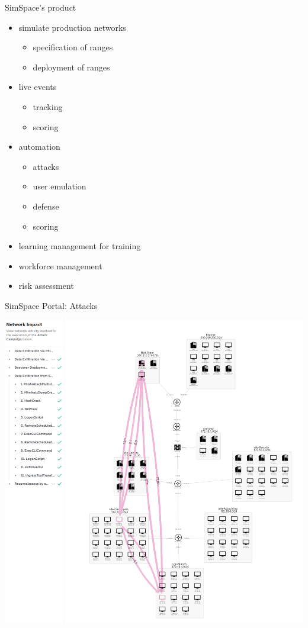 \documentclass[aspectratio=169,ignorenonframetext]{beamer}
\begin{document}
\begin{frame}{SimSpace's product}
	\begin{multicols}{2}
		\begin{itemize}
			\item simulate production networks
			      \begin{itemize}
				      \item specification of ranges
				      \item deployment of ranges
			      \end{itemize}
			\item live events
			      \begin{itemize}
				      \item tracking
				      \item scoring
			      \end{itemize}
			      \columnbreak
			\item automation
			      \begin{itemize}
				      \item attacks
				      \item user emulation
				      \item defense
				      \item scoring
			      \end{itemize}
			\item learning management for training
			\item workforce management
			\item risk assessment
		\end{itemize}
	\end{multicols}
\end{frame}

\begin{frame}{SimSpace Portal: Attacks}
	\begin{center}
		\includegraphics[height=.6\textheight]{images/automated_attacks.png}
	\end{center}
\end{frame}
\end{document}
